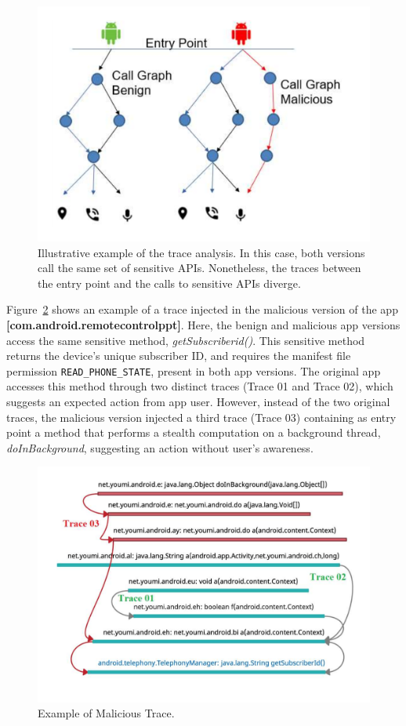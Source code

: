 \begin{figure}[ht]
\centering
\includegraphics[scale=0.30]{images/maliciousCallGraph.pdf}
\caption{Illustrative example of the trace analysis. In this case, both versions call the same set of sensitive APIs. Nonetheless,
the traces between the entry point and the calls to sensitive APIs diverge.}
 \label{fig:callGraph}
\end{figure}


Figure~\ref{fig:maliciousTrace} shows an example of a trace injected in the malicious version of the
app \textbf{[com.android.remotecontrolppt]}. Here, the benign and malicious app versions access the same
sensitive method, \textit{getSubscriberid()}. This sensitive method returns the device's unique
subscriber ID, and requires the manifest file permission \texttt{READ\_PHONE\_STATE}, present in both app versions.
The original app accesses this method through two distinct traces (Trace 01 and Trace 02), which suggests an expected action from app user. However,
instead of the two original traces, the malicious version injected a third trace (Trace 03) containing as entry point a method that performs a stealth
computation on a background thread, \textit{doInBackground}, suggesting an action without user's awareness.


\begin{figure}
\centering
\includegraphics[scale=0.28]{images/maliciousTrace_example01.pdf}
\caption{Example of Malicious Trace.}
 \label{fig:maliciousTrace}
\end{figure}
